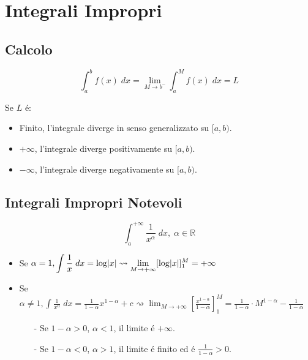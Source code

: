 \documentclass{article}
\begin{document}
\section{Integrali Impropri}

\subsection{Calcolo}

\begin{equation*}
    \int_{a}^b f(x) \; dx = \lim_{M \to b^-} \int_{a}^M f(x) \; dx = L
\end{equation*}

Se $L$ é:

\begin{itemize}
    \item Finito, l'integrale diverge in senso generalizzato su $[a, b)$.
    \item $+ \infty$, l'integrale diverge positivamente su $[a, b)$.
    \item $- \infty$, l'integrale diverge negativamente su $[a, b)$.
\end{itemize}

\subsection{Integrali Impropri Notevoli}

\begin{equation*}
    \int_{a}^{+ \infty} \frac{1}{x^\alpha} \; dx, \; \alpha \in \mathbb{R}
\end{equation*}

\begin{itemize}
    \item Se $\displaystyle \alpha = 1, \int \frac{1}{x} \; dx = \log{\abs{x}} \rightsquigarrow \lim_{M \to + \infty} [\log{\abs{x}}]_{1}^M = + \infty$
    \item Se $\displaystyle \alpha \neq 1, \int \frac{1}{x^\alpha} \; dx = \frac{1}{1 - \alpha} x^{1 - \alpha} + c \rightsquigarrow \lim_{M \to + \infty} [\frac{x^{1-\alpha}}{1 - \alpha}]_{1}^M = \frac{1}{1 - \alpha} \cdot M^{1 - \alpha} - \frac{1}{1 - \alpha}$
        \begin{itemize}
            \item[-] Se $1 -\alpha > 0$, $\alpha < 1$, il limite é $+ \infty$.
            \item[-] Se $1 -\alpha < 0$, $\alpha > 1$, il limite é finito ed é $\frac{1}{1 - \alpha} > 0$. 
        \end{itemize}
\end{itemize}
\end{document}
